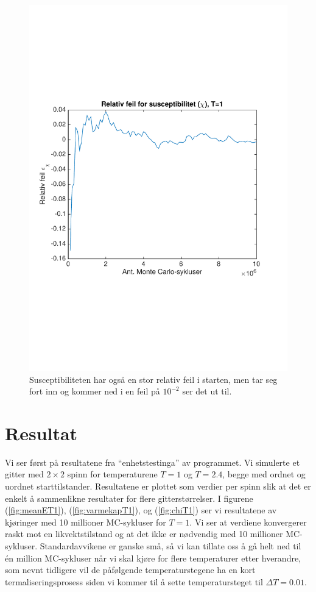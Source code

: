 \documentclass[norsk, 10pt]{article}
\begin{document}
\begin{figure}[H]
\centering
\includegraphics[scale = 0.6, trim = 1cm 8cm 1cm 8cm]{b_rel_err_chi_L2_T1.pdf}
\caption{Susceptibiliteten har også en stor relativ feil i starten, men tar seg fort inn og kommer ned i en feil på $10^{-2}$ ser det ut til.}
\label{fig:errchiT1L2}
\end{figure}


\section*{Resultat}
Vi ser først på resultatene fra ``enhetstestinga'' av programmet. Vi simulerte et gitter med $2\times2$ spinn for temperaturene $T=1$ og $T=2.4$, begge med ordnet og uordnet starttilstander. Resultatene er plottet som verdier per spinn slik at det er enkelt å sammenlikne resultater for flere gitterstørrelser. I figurene (\ref{fig:meanET1}), (\ref{fig:varmekapT1}), og (\ref{fig:chiT1}) ser vi resultatene av kjøringer med 10 millioner MC-sykluser for $T=1$. Vi ser at verdiene konvergerer raskt mot en likvektstilstand og at det ikke er nødvendig med 10 millioner MC-sykluser. Standardavvikene er ganske små, så vi kan tillate oss å gå helt ned til én million MC-sykluser når vi skal kjøre for flere temperaturer etter hverandre, som nevnt tidligere vil de påfølgende temperaturstegene ha en kort termaliseringsprosess siden vi kommer til å sette temperatursteget til $\Delta T = 0.01$.
\end{document}
